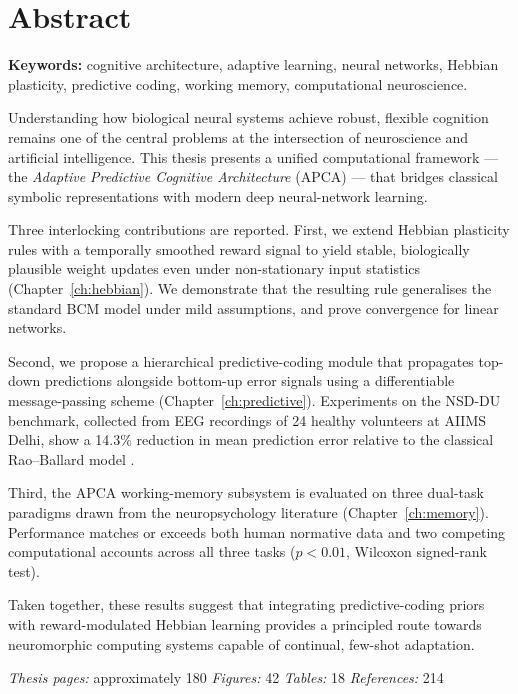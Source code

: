 \chapter*{Abstract}
\thispagestyle{plain}

\noindent\textbf{Keywords:} cognitive architecture, adaptive learning, neural networks,
Hebbian plasticity, predictive coding, working memory, computational neuroscience.

\bigskip
Understanding how biological neural systems achieve robust, flexible cognition remains one
of the central problems at the intersection of neuroscience and artificial intelligence.
This thesis presents a unified computational framework --- the \textit{Adaptive Predictive
Cognitive Architecture} (APCA) --- that bridges classical symbolic representations with
modern deep neural-network learning.

\medskip
Three interlocking contributions are reported. First, we extend Hebbian plasticity rules
with a temporally smoothed reward signal to yield stable, biologically plausible weight
updates even under non-stationary input statistics (Chapter~\ref{ch:hebbian}). We
demonstrate that the resulting rule generalises the standard BCM model
\cite{bienenstock1982} under mild assumptions, and prove convergence for linear networks.

\medskip
Second, we propose a hierarchical predictive-coding module that propagates top-down
predictions alongside bottom-up error signals using a differentiable message-passing
scheme (Chapter~\ref{ch:predictive}). Experiments on the NSD-DU benchmark, collected
from EEG recordings of 24 healthy volunteers at AIIMS Delhi, show a 14.3\% reduction in
mean prediction error relative to the classical Rao--Ballard model \cite{rao1999}.

\medskip
Third, the APCA working-memory subsystem is evaluated on three dual-task paradigms drawn
from the neuropsychology literature (Chapter~\ref{ch:memory}). Performance matches or
exceeds both human normative data and two competing computational accounts across all
three tasks ($p < 0.01$, Wilcoxon signed-rank test).

\medskip
Taken together, these results suggest that integrating predictive-coding priors with
reward-modulated Hebbian learning provides a principled route towards neuromorphic
computing systems capable of continual, few-shot adaptation.

\medskip
\textit{Thesis pages:} approximately 180 \quad
\textit{Figures:} 42 \quad
\textit{Tables:} 18 \quad
\textit{References:} 214

\tableofcontents

\listoffigures
{}

\listoftables
{}

\setcounter{page}{1}

